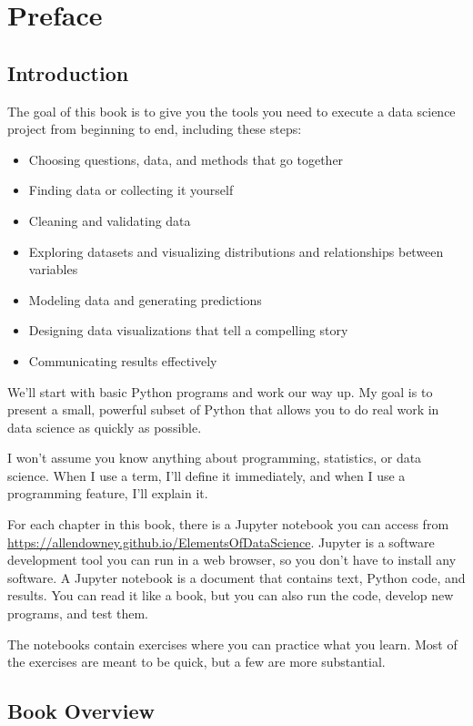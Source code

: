 \chapter{Preface}

\section*{Introduction}

The goal of this book is to give you the tools you need to execute a data science project from beginning to end, including these steps:

\begin{itemize}
\item
  Choosing questions, data, and methods that go together
\item
  Finding data or collecting it yourself
\item
  Cleaning and validating data
\item
  Exploring datasets and visualizing distributions and relationships between variables
\item
  Modeling data and generating predictions
\item
  Designing data visualizations that tell a compelling story
\item
  Communicating results effectively
\end{itemize}

We'll start with basic Python programs and work our way up.
My goal is to present a small, powerful subset of Python that allows you to do real work in data science as quickly as possible.

I won't assume you know anything about programming, statistics, or data science. When I use a term, I'll define it immediately, and when I use a programming feature, I'll explain it.

For each chapter in this book, there is a Jupyter notebook you can access from \url{https://allendowney.github.io/ElementsOfDataScience}.
Jupyter is a software development tool you can run in a web browser, so you don't have to install any software. A Jupyter notebook is a document that contains text, Python code, and results.
You can read it like a book, but you can also run the code, develop new programs, and test them.

The notebooks contain exercises where you can practice what you learn.
Most of the exercises are meant to be quick, but a few are more substantial.

\section*{Book Overview}

